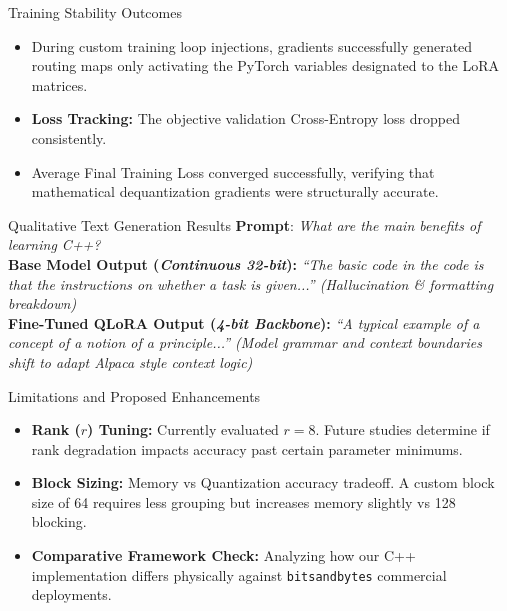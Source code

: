 \documentclass[aspectratio=169]{beamer}
\begin{document}
\begin{frame}{Training Stability Outcomes}
    \begin{itemize}
        \item During custom training loop injections, gradients successfully generated routing maps only activating the PyTorch variables designated to the LoRA matrices.
        \item \textbf{Loss Tracking:} The objective validation Cross-Entropy loss dropped consistently.
        \item Average Final Training Loss converged successfully, verifying that mathematical dequantization gradients were structurally accurate.
    \end{itemize}
\end{frame}

\begin{frame}{Qualitative Text Generation Results}
    \textbf{Prompt}: \textit{What are the main benefits of learning C++?}\\
    \vspace{0.3cm}
    \textbf{Base Model Output (\textit{Continuous 32-bit}):}
    \textit{``The basic code in the code is that the instructions on whether a task is given...'' (Hallucination \& formatting breakdown)} \\
    \vspace{0.3cm}
    \textbf{Fine-Tuned QLoRA Output (\textit{4-bit Backbone}):}
    \textit{``A typical example of a concept of a notion of a principle...'' (Model grammar and context boundaries shift to adapt Alpaca style context logic)}
\end{frame}

\begin{frame}{Limitations and Proposed Enhancements}
    \begin{itemize}
        \item \textbf{Rank ($r$) Tuning:} Currently evaluated $r=8$. Future studies determine if rank degradation impacts accuracy past certain parameter minimums.
        \item \textbf{Block Sizing:} Memory vs Quantization accuracy tradeoff. A custom block size of 64 requires less grouping but increases memory slightly vs 128 blocking.
        \item \textbf{Comparative Framework Check:} Analyzing how our C++ implementation differs physically against \texttt{bitsandbytes} commercial deployments.
    \end{itemize}
\end{frame}
\end{document}
